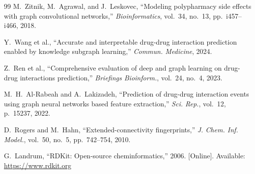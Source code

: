 \documentclass[10pt,twocolumn]{article}
\begin{document}
\begin{thebibliography}{99}
M.~Zitnik, M.~Agrawal, and J.~Leskovec, ``Modeling polypharmacy side effects
with graph convolutional networks,'' \textit{Bioinformatics}, vol.~34,
no.~13, pp.~i457--i466, 2018.

Y.~Wang et al., ``Accurate and interpretable drug-drug interaction prediction
enabled by knowledge subgraph learning,''
\textit{Commun. Medicine}, 2024.

Z.~Ren et al., ``Comprehensive evaluation of deep and graph learning on
drug-drug interactions prediction,''
\textit{Briefings Bioinform.}, vol.~24, no.~4, 2023.

M.~H.~Al-Rabeah and A.~Lakizadeh, ``Prediction of drug-drug interaction events
using graph neural networks based feature extraction,''
\textit{Sci. Rep.}, vol.~12, p.~15237, 2022.

D.~Rogers and M.~Hahn, ``Extended-connectivity fingerprints,''
\textit{J. Chem. Inf. Model.}, vol.~50, no.~5, pp.~742--754, 2010.

G.~Landrum, ``RDKit: Open-source cheminformatics,'' 2006. [Online].
Available: \url{https://www.rdkit.org}

\end{thebibliography}
\end{document}
